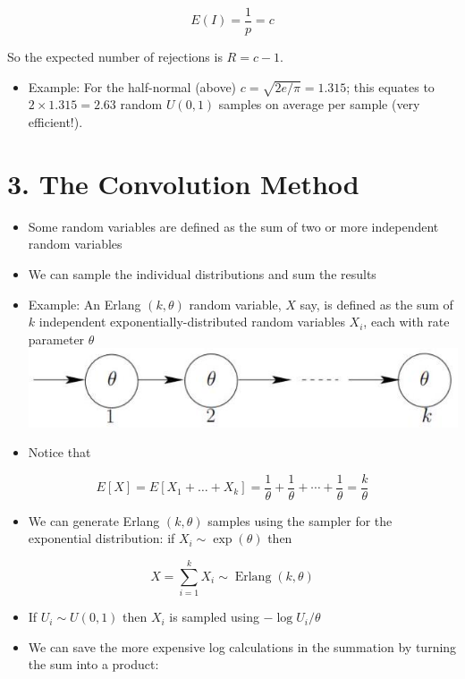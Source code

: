 \documentclass[10pt]{article}
\begin{document}
$$
E(I)=\frac{1}{p}=c
$$

So the expected number of rejections is $R=c-1$.

\begin{itemize}
  \item Example: For the half-normal (above) $c=\sqrt{2 e / \pi}=1.315$; this equates to $2 \times 1.315=2.63$ random $U(0,1)$ samples on average per sample (very efficient!).
\end{itemize}

\section*{3. The Convolution Method}
\begin{itemize}
  \item Some random variables are defined as the sum of two or more independent random variables
  \item We can sample the individual distributions and sum the results
  \item Example: An Erlang $(k, \theta)$ random variable, $X$ say, is defined as the sum of $k$ independent exponentially-distributed random variables $X_{i}$, each with rate parameter $\theta$\\
\includegraphics[max width=\textwidth, center]{2025_05_12_520db7cd238ba7b44f0fg-43}
  \item Notice that
\end{itemize}

$$
E[X]=E\left[X_{1}+\ldots+X_{k}\right]=\frac{1}{\theta}+\frac{1}{\theta}+\cdots+\frac{1}{\theta}=\frac{k}{\theta}
$$

\begin{itemize}
  \item We can generate Erlang $(k, \theta)$ samples using the sampler for the exponential distribution: if $X_{i} \sim \exp (\theta)$ then
\end{itemize}

$$
X=\sum_{i=1}^{k} X_{i} \sim \operatorname{Erlang}(k, \theta)
$$

\begin{itemize}
  \item If $U_{i} \sim U(0,1)$ then $X_{i}$ is sampled using $-\log U_{i} / \theta$
  \item We can save the more expensive log calculations in the summation by turning the sum into a product:
\end{itemize}
\end{document}
